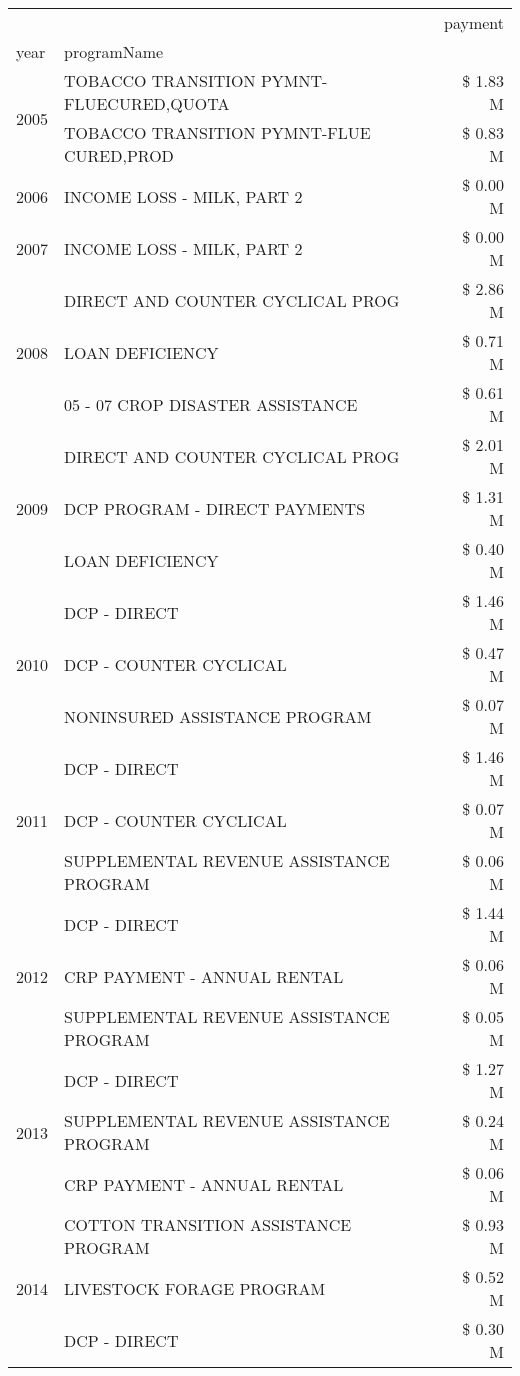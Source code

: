 \begin{tabular}{llr}
\toprule
 &  & payment \\
year & programName &  \\
\midrule
\multirow[t]{2}{*}{2005} & TOBACCO TRANSITION PYMNT-FLUECURED,QUOTA & \$ 1.83 M \\
 & TOBACCO TRANSITION PYMNT-FLUE CURED,PROD & \$ 0.83 M \\
\cline{1-3}
2006 & INCOME LOSS - MILK, PART 2 & \$ 0.00 M \\
\cline{1-3}
2007 & INCOME LOSS - MILK, PART 2 & \$ 0.00 M \\
\cline{1-3}
\multirow[t]{3}{*}{2008} & DIRECT AND COUNTER CYCLICAL PROG & \$ 2.86 M \\
 & LOAN DEFICIENCY & \$ 0.71 M \\
 & 05 - 07 CROP DISASTER ASSISTANCE & \$ 0.61 M \\
\cline{1-3}
\multirow[t]{3}{*}{2009} & DIRECT AND COUNTER CYCLICAL PROG & \$ 2.01 M \\
 & DCP PROGRAM - DIRECT PAYMENTS & \$ 1.31 M \\
 & LOAN DEFICIENCY & \$ 0.40 M \\
\cline{1-3}
\multirow[t]{3}{*}{2010} & DCP - DIRECT & \$ 1.46 M \\
 & DCP - COUNTER CYCLICAL & \$ 0.47 M \\
 & NONINSURED ASSISTANCE PROGRAM & \$ 0.07 M \\
\cline{1-3}
\multirow[t]{3}{*}{2011} & DCP - DIRECT & \$ 1.46 M \\
 & DCP - COUNTER CYCLICAL & \$ 0.07 M \\
 & SUPPLEMENTAL REVENUE ASSISTANCE PROGRAM & \$ 0.06 M \\
\cline{1-3}
\multirow[t]{3}{*}{2012} & DCP - DIRECT & \$ 1.44 M \\
 & CRP PAYMENT - ANNUAL RENTAL & \$ 0.06 M \\
 & SUPPLEMENTAL REVENUE ASSISTANCE PROGRAM & \$ 0.05 M \\
\cline{1-3}
\multirow[t]{3}{*}{2013} & DCP - DIRECT & \$ 1.27 M \\
 & SUPPLEMENTAL REVENUE ASSISTANCE PROGRAM & \$ 0.24 M \\
 & CRP PAYMENT - ANNUAL RENTAL & \$ 0.06 M \\
\cline{1-3}
\multirow[t]{3}{*}{2014} & COTTON TRANSITION ASSISTANCE PROGRAM & \$ 0.93 M \\
 & LIVESTOCK FORAGE PROGRAM & \$ 0.52 M \\
 & DCP - DIRECT & \$ 0.30 M \\

\end{tabular}
